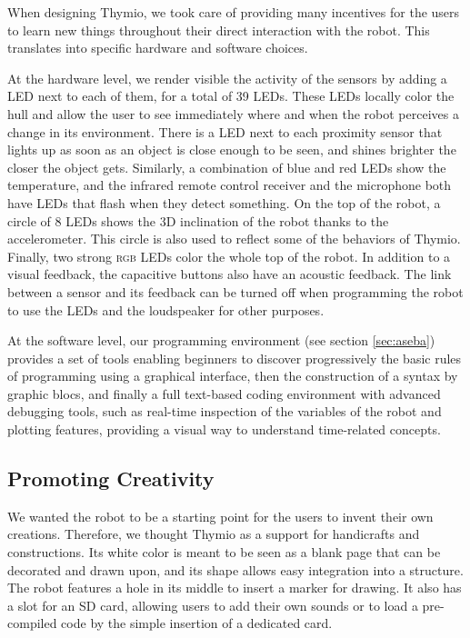 \documentclass[letterpaper, 10 pt, conference]{ieeeconf}  %
\begin{document}
When designing Thymio, we took care of providing many incentives for the users to learn new things throughout their direct interaction with the robot.
This translates into specific hardware and software choices.

At the hardware level, we render visible the activity of the sensors by adding a LED next to each of them, for a total of 39 LEDs.
These LEDs locally color the hull and allow the user to see immediately where and when the robot perceives a change in its environment.
There is a LED next to each proximity sensor that lights up as soon as an object is close enough to be seen, and shines brighter the closer the object gets.
Similarly, a combination of blue and red LEDs show the temperature, and the infrared remote control receiver and the microphone both have LEDs that flash when they detect something.
On the top of the robot, a circle of 8 LEDs shows the 3D inclination of the robot thanks to the accelerometer. 
This circle is also used to reflect some of the behaviors of Thymio.
Finally, two strong \textsc{rgb} LEDs color the whole top of the robot.
In addition to a visual feedback, the capacitive buttons also have an acoustic feedback.
The link between a sensor and its feedback can be turned off when programming the robot to use the LEDs and the loudspeaker for other purposes.

At the software level, our programming environment (see section \ref{sec:aseba}) provides a set of tools enabling beginners to discover progressively the basic rules of programming using a graphical interface, then the construction of a syntax by graphic blocs, and finally a full text-based coding environment with advanced debugging tools, such as real-time inspection of the variables of the robot and plotting features, providing a visual way to understand time-related concepts.

\subsection{Promoting Creativity}
\label{sec:crea}

We wanted the robot to be a starting point for the users to invent their own creations.
Therefore, we thought Thymio as a support for handicrafts and constructions.
Its white color is meant to be seen as a blank page that can be decorated and drawn upon, and its shape allows easy integration into a structure.
The robot features a hole in its middle to insert a marker for drawing.
It also has a slot for an SD card, allowing users to add their own sounds or to load a pre-compiled code by the simple insertion of a dedicated card.
\end{document}
